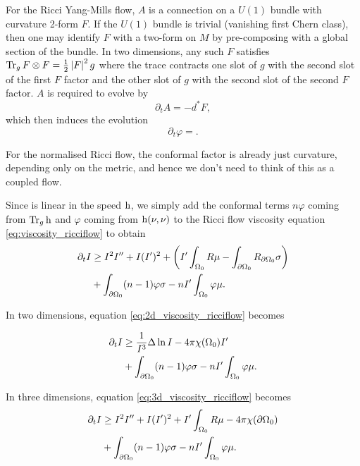 \documentclass{amsart}
\begin{document}
For the Ricci Yang-Mills flow, \(A\) is a connection on a \(U(1)\) bundle with curvature 2-form \(F\). If the \(U(1)\) bundle is trivial (vanishing first Chern class), then one may identify \(F\) with a two-form on \(M\) by pre-composing with a global section of the bundle. In two dimensions, any such \(F\) satisfies \(\operatorname{Tr}_g F \otimes F = \tfrac{1}{2} \left|{F}\right|^2 g\) where the trace contracts one slot of \(g\) with the second slot of the first \(F\) factor and the other slot of \(g\) with the second slot of the second \(F\) factor. \(A\) is required to evolve by
\[
\partial_t A = -d^{\ast} F,
\]
which then induces the evolution
\[
\partial_t \varphi = .
\]

For the normalised Ricci flow, the conformal factor is already just curvature, depending only on the metric, and hence we don't need to think of this as a coupled flow.

Since  is linear in the speed \(\operatorname{h}\), we simply add the conformal terms \(n \varphi\) coming from \(\operatorname{Tr}_g \operatorname{h}\) and \(\varphi\) coming from \(\operatorname{h}(\nu, \nu)\) to the Ricci flow viscosity equation \eqref{eq:viscosity_ricciflow} to obtain
\begin{equation}
\label{eq:viscosity_conformalcoupledricciflow}
\begin{split}
\partial_t I &\geq I^2I'' + I(I')^2 + \left(I'\int_{\Omega_0} R \mu - \int_{\partial {\Omega_0}} R_{\partial {\Omega_0}}\sigma \right) \\
&+ \int_{\partial {\Omega_0}} (n-1) \varphi\sigma - n I' \int_{\Omega_0} \varphi \mu.
\end{split}
\end{equation}

In two dimensions, equation \eqref{eq:2d_viscosity_ricciflow} becomes

\begin{equation}
\label{eq:2d_viscosity_conformalcoupledricciflow}
\begin{split}
\partial_t I &\geq \frac{1}{I^3} \Delta \ln I - 4\pi\chi(\Omega_0)I' \\
&+ \int_{\partial {\Omega_0}} (n-1) \varphi\sigma - n I' \int_{\Omega_0} \varphi \mu.
\end{split}
\end{equation}

In three dimensions, equation \eqref{eq:3d_viscosity_ricciflow} becomes
\begin{equation}
\label{eq:3d_viscosity_conformalcoupledricciflow}
\begin{split}
\partial_t I &\geq I^2I'' + I(I')^2 + I'\int_{\Omega_0} R \mu - 4\pi\chi(\partial {\Omega_0}) \\
&+ \int_{\partial {\Omega_0}} (n-1) \varphi\sigma - n I' \int_{\Omega_0} \varphi \mu.
\end{split}
\end{equation}
\end{document}
